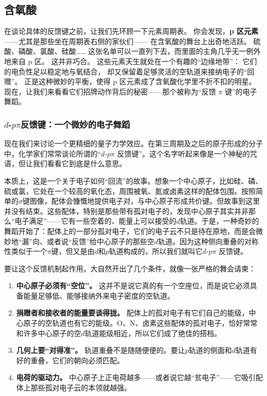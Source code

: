 \documentclass[UTF8]{ctexbook}
\begin{document}
\subsection{含氧酸}

在谈论具体的反馈键之前，让我们先环顾一下元素周期表。
你会发现，\textbf{p 区元素}——尤其是那些坐在周期表右侧的家伙们——
在含氧酸的舞台上出奇地活跃。
硫酸、磷酸、氯酸、硅酸……
这张名单可以一直列下去，而里面的主角几乎无一例外地来自 p 区。
这并非巧合。
这些元素天生就处在一个有趣的“边缘地带”：
它们的电负性足以稳定地与氧结合，
却又保留着足够灵活的空轨道来接纳电子的“回赠”。
正是这种微妙的平衡，使得 p 区元素成了含氧酸化学里不折不扣的明星。
现在，让我们来看看它们招牌动作背后的秘密——那个被称为“反馈 $\pi$ 键”的电子舞蹈。

\subsubsection{\texorpdfstring{$d$-$p\pi$}{d-p pi}反馈键：一个微妙的电子舞蹈}

现在我们来讨论一个更精细的量子力学效应。在第三周期及之后的原子形成的分子中，化学家们常常谈论所谓的“$d$-$p\pi$ 反馈键”。这个名字听起来像是一个神秘的咒语，但让我们看看它到底是什么意思。

本质上，这是一个关于电子如何“回流”的故事。想象一个中心原子，比如硅、磷、硫或氯，它处在一个较高的氧化态，周围被氧、氮或卤素这样的配体包围。按照简单的$\sigma$键图像，配体会慷慨地提供电子对，与中心原子形成共价键。但故事到这里并没有结束。这些配体，特别是那些带有孤对电子的，发现中心原子其实并非那么“电子满足”——它有一些空着的、能量上可以接受的$d$轨道。于是，一种奇妙的舞蹈开始了：配体上的一部分孤对电子，它们的电子云不只是待在原地，而是会微妙地“漏”向、或者说“反馈”给中心原子的那些空$d$轨道。因为这种侧向重叠的对称性类似于一个$\pi$键，但又是由$d$和$p$轨道构成的，所以我们就叫它$d$-$p\pi$ 反馈键。

要让这个反馈机制起作用，大自然开出了几个条件，就像一张严格的舞会请柬：

\begin{enumerate}
  \item \textbf{中心原子必须有“空位”。} 这并不是说它真的有一个空座位，而是说它必须具备能量足够低、能够接纳外来电子密度的空轨道。
  
  \item \textbf{捐赠者和接收者的能量要谈得拢。} 配体上的孤对电子有它们自己的能级，中心原子的空轨道也有它的能级。O、N、卤素这些配体的孤对电子，恰好常常和许多中心原子的空$d$轨道能级相近，所以它们成了绝佳的搭档。
  
  \item \textbf{几何上要“对得准”。} 轨道重叠不是随随便便的。要让$p$轨道的侧面和$d$轨道有好的重叠，它们的朝向必须匹配。
  
  \item \textbf{电荷的驱动力。} 中心原子上正电荷越多——或者说它越“贫电子”——它吸引配体上那些孤对电子云的本领就越强。
\end{enumerate}
\end{document}
